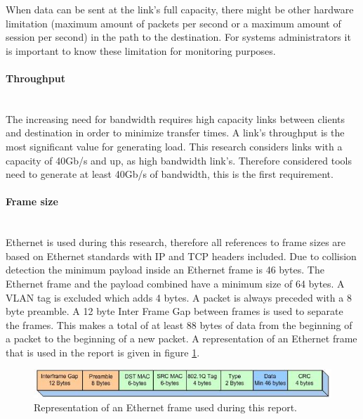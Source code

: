 When data can be sent at the link's full capacity, there might be other hardware limitation (maximum amount of packets per second or a maximum amount of session per second) in the path to the destination.
For systems administrators it is important to know these limitation for monitoring purposes.

\paragraph{Throughput}\label{par:throughput}\mbox{}\\
The increasing need for bandwidth requires high capacity links between clients and destination in order to minimize transfer times.
A link's throughput is the most significant value for generating load. 
This research considers links with a capacity of 40Gb/s and up, as high bandwidth link's.
Therefore considered tools need to generate at least 40Gb/s of bandwidth, this is the first requirement.  


\paragraph{Frame size}\label{par:packetsize}\mbox{}\\
Ethernet is used during this research, therefore all references to frame sizes are based on Ethernet standards\cite{ethernet_frame_2017} with IP and TCP headers included.
Due to collision detection the minimum payload inside an Ethernet frame is 46 bytes.
The Ethernet frame and the payload combined have a minimum size of 64 bytes. 
A VLAN tag is excluded which adds 4 bytes.
A packet is always preceded with a 8 byte preamble.
A 12 byte Inter Frame Gap between frames is used to separate the frames. 
This makes a total of at least 88 bytes of data from the beginning of a packet to the beginning of a new packet. 
A representation of an Ethernet frame that is used in the report is given in figure \ref{fig:juniperethernetframe}. 

\begin{figure}[H]
  \includegraphics[scale=1]{images/ethernetframe.jpg}
  \caption{Representation of an Ethernet frame used during this report.}
  \label{fig:juniperethernetframe}
\end{figure}


